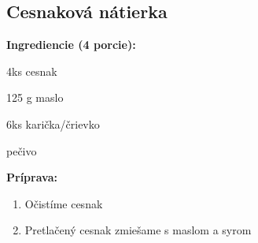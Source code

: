 \setcounter{step}{0}

\subsection{ Cesnaková nátierka }

\begin{ingredient}
  
  \def\portions{  }
  \textbf{ {\normalsize Ingrediencie (4 porcie):} }

  \begin{main}
      \item 4ks cesnak
      \item 125 g maslo
      \item 6ks karička/črievko
      \item pečivo
  \end{main}
  
\end{ingredient}
\begin{recipe}
\textbf{ {\normalsize Príprava:} }
\begin{enumerate}

  \item{Očistíme cesnak}
  \item{Pretlačený cesnak zmiešame s maslom a syrom}

\end{enumerate}
\end{recipe}

\begin{notes}
  
\end{notes}	
\clearpage
